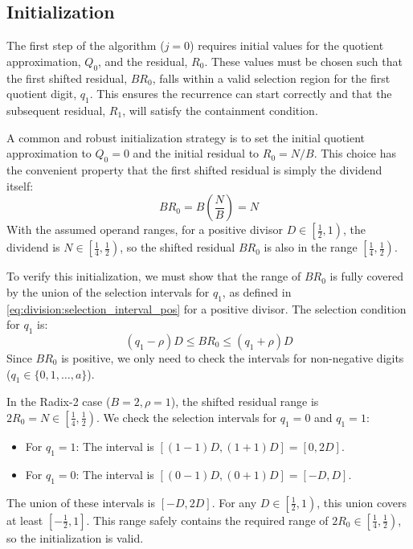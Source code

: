 \documentclass{article}
\begin{document}
\subsection{Initialization}
\label{ssec:division:init}
The first step of the algorithm ($j = 0$) requires initial values for the quotient approximation, $Q_0$, and the residual, $R_0$.
These values must be chosen such that the first shifted residual, $B R_0$, falls within a valid selection region for the first quotient digit, $q_1$.
This ensures the recurrence can start correctly and that the subsequent residual, $R_1$, will satisfy the containment condition.

A common and robust initialization strategy is to set the initial quotient approximation to $Q_0 = 0$ and the initial residual to $R_0 = N / B$.
This choice has the convenient property that the first shifted residual is simply the dividend itself:
\begin{equation}
  \label{eq:division:init_br0}
  B R_0 = B \left(\frac{N}{B}\right) = N
\end{equation}
With the assumed operand ranges, for a positive divisor $D \in \left[\frac{1}{2}, 1\right)$, the dividend is $N \in \left[\frac{1}{4}, \frac{1}{2}\right)$, so the shifted residual $B R_0$ is also in the range $\left[\frac{1}{4}, \frac{1}{2}\right)$.

To verify this initialization, we must show that the range of $B R_0$ is fully covered by the union of the selection intervals for $q_1$, as defined in \cref{eq:division:selection_interval_pos} for a positive divisor.
The selection condition for $q_1$ is:
\begin{equation}
  \label{eq:division:init_selection}
  (q_1 - \rho) D \leq B R_0 \leq (q_1 + \rho) D
\end{equation}
Since $B R_0$ is positive, we only need to check the intervals for non-negative digits ($q_1 \in \{0, 1, \dots, a\}$).

In the Radix-2 case ($B = 2, \rho = 1$), the shifted residual range is $2 R_0 = N \in \left[\frac{1}{4}, \frac{1}{2}\right)$.
We check the selection intervals for $q_1 = 0$ and $q_1 = 1$:
\begin{itemize}
    \item For $q_1 = 1$: The interval is $[(1-1)D, (1+1)D] = [0, 2D]$.
    \item For $q_1 = 0$: The interval is $[(0-1)D, (0+1)D] = [-D, D]$.
\end{itemize}
The union of these intervals is $[-D, 2D]$.
For any $D \in \left[\frac{1}{2}, 1\right)$, this union covers at least $\left[-\frac{1}{2}, 1\right]$.
This range safely contains the required range of $2 R_0 \in \left[\frac{1}{4}, \frac{1}{2}\right)$, so the initialization is valid.
\end{document}
